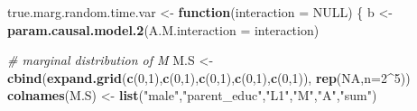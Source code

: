 \documentclass[
]{book}
\newenvironment{Shaded}{\begin{snugshade}}{\end{snugshade}}
\newcommand{\AttributeTok}[1]{\textcolor[rgb]{0.13,0.29,0.53}{#1}}
\newcommand{\CommentTok}[1]{\textcolor[rgb]{0.56,0.35,0.01}{\textit{#1}}}
\newcommand{\ConstantTok}[1]{\textcolor[rgb]{0.56,0.35,0.01}{#1}}
\newcommand{\ControlFlowTok}[1]{\textcolor[rgb]{0.13,0.29,0.53}{\textbf{#1}}}
\newcommand{\DecValTok}[1]{\textcolor[rgb]{0.00,0.00,0.81}{#1}}
\newcommand{\FunctionTok}[1]{\textcolor[rgb]{0.13,0.29,0.53}{\textbf{#1}}}
\newcommand{\NormalTok}[1]{#1}
\newcommand{\OtherTok}[1]{\textcolor[rgb]{0.56,0.35,0.01}{#1}}
\newcommand{\SpecialCharTok}[1]{\textcolor[rgb]{0.81,0.36,0.00}{\textbf{#1}}}
\newcommand{\StringTok}[1]{\textcolor[rgb]{0.31,0.60,0.02}{#1}}
\begin{document}
\begin{Shaded}
\begin{Highlighting}[]
\NormalTok{true.marg.random.time.var }\OtherTok{\textless{}{-}} \ControlFlowTok{function}\NormalTok{(}\AttributeTok{interaction =} \ConstantTok{NULL}\NormalTok{) \{}
\NormalTok{  b }\OtherTok{\textless{}{-}} \FunctionTok{param.causal.model.2}\NormalTok{(}\AttributeTok{A.M.interaction =}\NormalTok{ interaction)}
  
  \CommentTok{\# marginal distribution of M}
\NormalTok{  M.S }\OtherTok{\textless{}{-}} \FunctionTok{cbind}\NormalTok{(}\FunctionTok{expand.grid}\NormalTok{(}\FunctionTok{c}\NormalTok{(}\DecValTok{0}\NormalTok{,}\DecValTok{1}\NormalTok{),}\FunctionTok{c}\NormalTok{(}\DecValTok{0}\NormalTok{,}\DecValTok{1}\NormalTok{),}\FunctionTok{c}\NormalTok{(}\DecValTok{0}\NormalTok{,}\DecValTok{1}\NormalTok{),}\FunctionTok{c}\NormalTok{(}\DecValTok{0}\NormalTok{,}\DecValTok{1}\NormalTok{),}\FunctionTok{c}\NormalTok{(}\DecValTok{0}\NormalTok{,}\DecValTok{1}\NormalTok{)), }\FunctionTok{rep}\NormalTok{(}\ConstantTok{NA}\NormalTok{,}\AttributeTok{n=}\DecValTok{2}\SpecialCharTok{\^{}}\DecValTok{5}\NormalTok{))}
  \FunctionTok{colnames}\NormalTok{(M.S) }\OtherTok{\textless{}{-}} \FunctionTok{list}\NormalTok{(}\StringTok{"male"}\NormalTok{,}\StringTok{"parent\_educ"}\NormalTok{,}\StringTok{"L1"}\NormalTok{,}\StringTok{"M"}\NormalTok{,}\StringTok{"A"}\NormalTok{,}\StringTok{"sum"}\NormalTok{)}
  

\end{Highlighting}
\end{Shaded}
\end{document}
